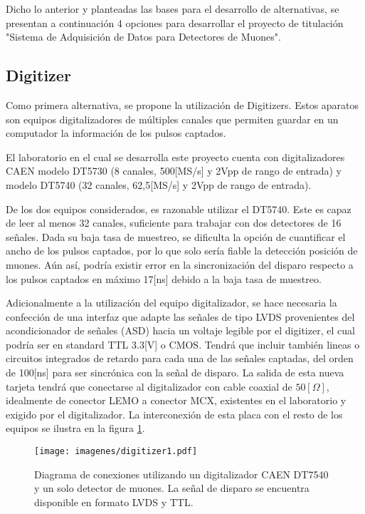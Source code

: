 \par Dicho lo anterior y planteadas las bases para el desarrollo de alternativas, se presentan a continuación 4 opciones para desarrollar el proyecto de titulación "Sistema de Adquisición de Datos para Detectores de Muones".


\newpage
\subsection{Digitizer}
Como primera alternativa, se propone la utilización de Digitizers. Estos aparatos son equipos digitalizadores de múltiples canales que permiten guardar en un computador la información de los pulsos captados.
\par El laboratorio en el cual se desarrolla este proyecto cuenta con digitalizadores CAEN modelo DT5730 (8 canales, 500[MS/s] y 2Vpp de rango de entrada) y modelo DT5740 (32 canales, 62,5[MS/s] y 2Vpp de rango de entrada). 
\par De los dos equipos considerados, es razonable utilizar el DT5740. Este es capaz de leer al menos 32 canales, suficiente para trabajar con dos detectores de 16 señales. Dada su baja tasa de muestreo, se dificulta la opción de cuantificar el ancho de los pulsos captados, por lo que solo sería fiable la detección posición de muones. Aún así, podría existir error en la sincronización del disparo respecto a los pulsos captados en máximo 17[ns] debido a la baja tasa de muestreo.

\par Adicionalmente a la utilización del equipo digitalizador, se hace necesaria la confección de una interfaz que adapte las señales de tipo LVDS provenientes del acondicionador de señales (ASD) hacia un voltaje legible por el digitizer, el cual podría ser en standard TTL 3.3[V] o CMOS. Tendrá que incluir también lineas o circuitos integrados de retardo para cada una de las señales captadas, del orden de 100[ns] para ser sincrónica con la señal de disparo. La salida de esta nueva tarjeta tendrá que conectarse al digitalizador con cable coaxial de $50[\Omega]$, idealmente de conector LEMO a conector MCX, existentes en el laboratorio y exigido por el digitalizador. La interconexión de esta placa con el resto de los equipos se ilustra en la figura \ref{fig:digitizer1}.

\begin{figure}[H]
	\centering
	\texttt{[image: imagenes/digitizer1.pdf]}
	\caption{Diagrama de conexiones utilizando un digitalizador CAEN DT7540 y un solo detector de muones. La señal de disparo se encuentra disponible en formato LVDS y TTL.}
	\label{fig:digitizer1}
\end{figure}


